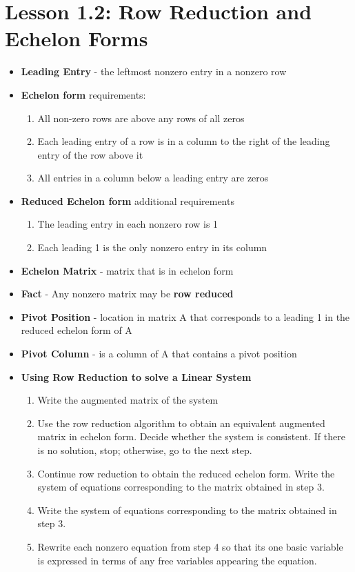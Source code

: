 \documentclass{report}
\begin{document}
\section{Lesson 1.2: Row Reduction and Echelon Forms}
	\begin{itemize}\addtolength{\leftskip}{2em}
		\item \textbf{Leading Entry} - the leftmost nonzero entry in a nonzero row
		\item \textbf{Echelon form} requirements:
		\begin{enumerate}
		\setlength{\itemindent}{4em}
			\item All non-zero rows are above any rows of all zeros
			\item Each leading entry of a row is in a column to the right of the leading entry of the row above it
			\item All entries in a column below a leading entry are zeros
		\end{enumerate}
		\item \textbf{Reduced Echelon form} additional requirements
		\begin{enumerate}
		\setlength{\itemindent}{4em}
			\item The leading entry in each nonzero row is 1
			\item Each leading 1 is the only nonzero entry in its column
		\end{enumerate}
		\item \textbf{Echelon Matrix} - matrix that is in echelon form
		\item \textbf{Fact} - Any nonzero matrix may be\textbf{ row reduced}
		\item \textbf{Pivot Position }- location in matrix A that corresponds to a leading 1 in the reduced echelon form of A
		\item \textbf{Pivot Column }- is a column of A that contains a pivot position
		\item \textbf{Using Row Reduction to solve a Linear System}
		\begin{enumerate}
		\addtolength{\leftskip}{4em}
			\item Write the augmented matrix of the system
			\item Use the row reduction algorithm to obtain an equivalent augmented matrix in echelon form. Decide whether the system is consistent. If there is no solution, stop; otherwise, go to the next step.
			\item Continue row reduction to obtain the reduced echelon form. Write the system of equations corresponding to the matrix obtained in step 3.
			\item Write the system of equations corresponding to the matrix obtained in step 3.
			\item Rewrite each nonzero equation from step 4 so that its one basic variable is expressed in terms of any free variables appearing the equation. 
		\end{enumerate}

		 
	\end{itemize}
\end{document}
